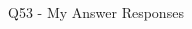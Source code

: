 \begin{frame}{Q53 - My Answer Responses}
\begin{multicols}{2}
    \begin{minipage}{\linewidth}
    \RaggedRight\textbf{\tiny {}} \\ 
    \vspace{4.00pt}
    \end{minipage}
    \vspace{10pt}

    \end{multicols}
\end{frame}

